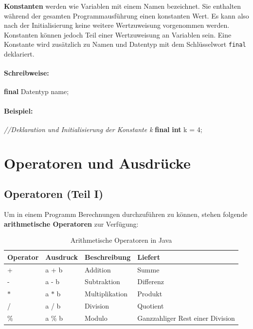 \documentclass[10pt,paper=17cm:22cm, twoside=true, DIV=14]{scrbook}
\newenvironment {Shaded}
        {\begin{mdframed}[style=code] }
         {\end{mdframed}}
\newcommand{\DataTypeTok}[1]{\textcolor[rgb]{0.1,0.1,0.1}{\textbf{#1}}}
\newcommand{\DecValTok}[1]{\textcolor[rgb]{0.4,0.4,0.4}{{#1}}}
\newcommand{\CommentTok}[1]{\textcolor[RGB]{128,128,128}{\textit{#1}}}
\newcommand{\NormalTok}[1]{#1}
\begin{document}
\textbf{Konstanten} werden wie Variablen mit einem Namen bezeichnet. Sie
enthalten während der gesamten Programmausführung einen konstanten Wert.
Es kann also nach der Initialisierung keine weitere Wertzuweisung
vorgenommen werden. Konstanten können jedoch Teil einer Wertzuweisung an
Variablen sein. Eine Konstante wird zusätzlich zu Namen und Datentyp mit
dem Schlüsselwort \texttt{final} deklariert.

\paragraph{Schreibweise:}\label{schreibweise-5}

\begin{Shaded}
\begin{Highlighting}[]
\DataTypeTok{final} \NormalTok{Datentyp name;}
\end{Highlighting}
\end{Shaded}

\paragraph{Beispiel:}\label{beispiel-14}

\begin{Shaded}
\begin{Highlighting}[]
\CommentTok{//Deklaration und Initialisierung der Konstante k}
\DataTypeTok{final} \DataTypeTok{int} \NormalTok{k = }\DecValTok{4}\NormalTok{;}
\end{Highlighting}
\end{Shaded}

\section{Operatoren und Ausdrücke}\label{operatoren-und-ausdrucke-1}

\subsection{Operatoren (Teil I)}\label{operatoren-teil-i-1}

Um in einem Programm Berechnungen durchzuführen zu können, stehen
folgende \textbf{arithmetische Operatoren} zur Verfügung:

\begin{table}[!htpb]\centering
\begin{tabular}{@{}llll@{}}

\toprule
 Operator & Ausdruck & Beschreibung & Liefert \\
\midrule
 + & a + b & Addition & Summe \\
 - & a - b& Subtraktion & Differenz \\
 $\ast$ & a $\ast$ b& Multiplikation& Produkt \\
 / & a / b& Division& Quotient \\
 \% & a \% b& Modulo& Ganzzahliger Rest einer Division \\
\bottomrule
\end{tabular}
\caption{Arithmetische Operatoren in Java}
\label{tab:Operators1}
\end{table}
\end{document}
